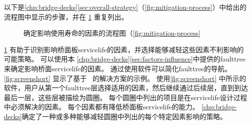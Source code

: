 以下是\cref{chp:bridge-decks}\cref{sec:overall-strategy}（\cref{fig:mitigation-process}）中给出的流程图中显示的步骤，并在 \cref{fig:flowchart-identify-factors} 重复列出。

\begin{figure}
  \caption{确定影响使用寿命的因素的流程图（\cref{fig:mitigation-process}}
  \label{fig:flowchart-identify-factors}
\end{figure}

\cref{fig:flowchart-identify-factors} 有助于识别影响桥面板\gls*{servicelife}的因素，并选择能够减轻这些因素不利影响的可能策略。 可以使用本 \cref{chp:bridge-decks}\cref{sec:factors-influence}中提供的\gls*{faulttree}来确定影响桥面\gls*{servicelife}的因素。 通过使用软件可以简化\gls*{faulttree}的导航。 \cref{fig:screenshort} 显示了基于 \Excel\ 的解决方案的示例。 使用\cref{fig:screenshort} 中所示的软件，用户从第一个\gls*{faulttree}层选择适用的因素，然后继续通过后续层，直到到达最后一层，这些层被描绘为圆圈。 每个圆圈中列出的项目是在\gls*{servicelife}设计过程中必须解决的因素。 每个因素都有降低桥面板\gls*{servicelife}的能力。 \cref{chp:bridge-decks}确定了一种或多种能够减轻圆圈中列出的每个特定因素影响的策略。

